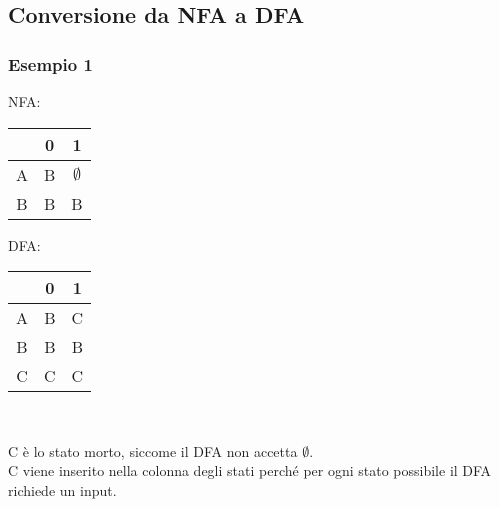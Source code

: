 \documentclass[12pt]{extarticle}
\begin{document}
\subsection{Conversione da NFA a DFA}
\subsubsection{Esempio 1}
NFA:
\begin{center}
    \begin{tabular}{c |c c} 
     & 0 & 1 \\
    \hline
    A & B & $\emptyset$\\
    B & B & B  \\
   \end{tabular}
\end{center}
DFA:
\begin{center}
    \begin{tabular}{c |c c} 
     & 0 & 1 \\
    \hline
    A & B & C\\
    B & B & B  \\
    C & C & C
   \end{tabular}\\
\end{center}
C è lo stato morto, siccome il DFA non accetta $\emptyset$.
\\C viene inserito nella colonna degli stati perché per ogni stato possibile
il DFA richiede un input.
\end{document}
